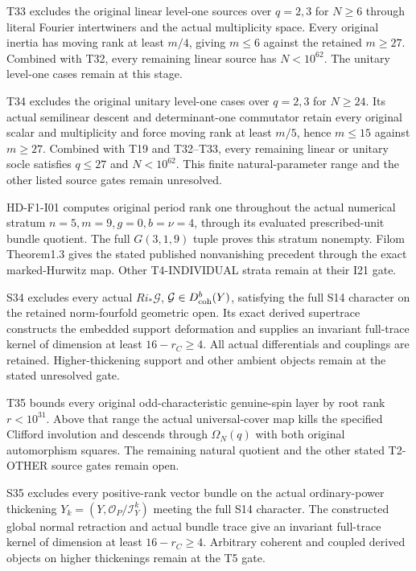 T33 excludes the original linear level-one sources over $q=2,3$ for $N\ge6$ through literal Fourier intertwiners and the actual multiplicity space. Every original inertia has moving rank at least $m/4$, giving $m\le6$ against the retained $m\ge27$. Combined with T32, every remaining linear source has $N<10^{62}$. The unitary level-one cases remain at this stage.




T34 excludes the original unitary level-one cases over $q=2,3$ for $N\ge24$. Its actual semilinear descent and determinant-one commutator retain every original scalar and multiplicity and force moving rank at least $m/5$, hence $m\le15$ against $m\ge27$. Combined with T19 and T32--T33, every remaining linear or unitary socle satisfies $q\le27$ and $N<10^{62}$. This finite natural-parameter range and the other listed source gates remain unresolved.




HD-F1-I01 computes original period rank one throughout the actual numerical stratum $n=5,m=9,g=0,b=\nu=4$, through its evaluated prescribed-unit bundle quotient. The full $G(3,1,9)$ tuple proves this stratum nonempty. Filom Theorem1.3 gives the stated published nonvanishing precedent through the exact marked-Hurwitz map. Other T4-INDIVIDUAL strata remain at their I21 gate.




S34 excludes every actual $Ri_*\mathcal G$, $\mathcal G\in D^b_{\rm coh}(Y)$, satisfying the full S14 character on the retained norm-fourfold geometric open. Its exact derived supertrace constructs the embedded support deformation and supplies an invariant full-trace kernel of dimension at least $16-r_C\ge4$. All actual differentials and couplings are retained. Higher-thickening support and other ambient objects remain at the stated unresolved gate.




T35 bounds every original odd-characteristic genuine-spin layer by root rank $r<10^{31}$. Above that range the actual universal-cover map kills the specified Clifford involution and descends through $\Omega_N(q)$ with both original automorphism squares. The remaining natural quotient and the other stated T2-OTHER source gates remain open.




S35 excludes every positive-rank vector bundle on the actual ordinary-power thickening $Y_k=(Y,\mathcal O_P/\mathcal I_Y^k)$ meeting the full S14 character. The constructed global normal retraction and actual bundle trace give an invariant full-trace kernel of dimension at least $16-r_C\ge4$. Arbitrary coherent and coupled derived objects on higher thickenings remain at the T5 gate.




